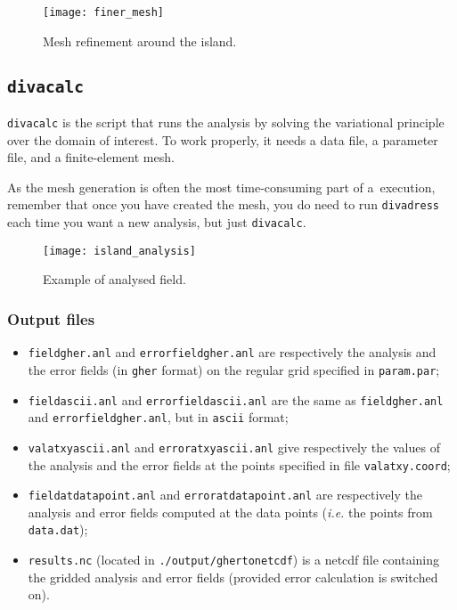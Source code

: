 \begin{figure}[htpb]
\centering
\texttt{[image: finer\_mesh]}
\caption{Mesh refinement around the island.\label{fig:square}}
\end{figure}



\subsection{\texttt{divacalc}\label{sec:divacalc}}

\texttt{divacalc} is the script that runs the analysis by solving the variational principle over the domain of interest. To work properly, it needs a data file, a parameter file, and a finite-element mesh.

\btips
As the mesh generation is often the most time-consuming part of a \diva\,execution, remember that once you have created the mesh, you do need to run \texttt{divadress} each time you want a new analysis, but just \texttt{divacalc}.
\etips

\begin{figure}[H]
\centering
\parbox{.7\textwidth}{
\texttt{[image: island\_analysis]}
}\parbox{.3\textwidth}{
\caption{Example of analysed field.}
}
\end{figure}


\subsubsection{Output files}

\begin{itemize}
\item \texttt{fieldgher.anl} and \texttt{errorfieldgher.anl} are respectively the analysis and the error fields (in \texttt{gher} format) on the regular grid specified in \texttt{param.par};
\item \texttt{fieldascii.anl} and \texttt{errorfieldascii.anl} are the same as \texttt{fieldgher.anl} and \texttt{errorfieldgher.anl}, but in \texttt{ascii} format;
\item \texttt{valatxyascii.anl} and \texttt{erroratxyascii.anl} give respectively the values of the analysis and the error fields at the points specified in file \texttt{valatxy.coord};
\item \texttt{fieldatdatapoint.anl} and \texttt{erroratdatapoint.anl} are respectively the analysis and error fields computed at the data points (\textit{i.e.} the points from \texttt{data.dat});
\item \texttt{results.nc} (located in \texttt{./output/ghertonetcdf}) is a netcdf file containing the gridded analysis and error fields (provided error calculation is switched on).
\end{itemize}


